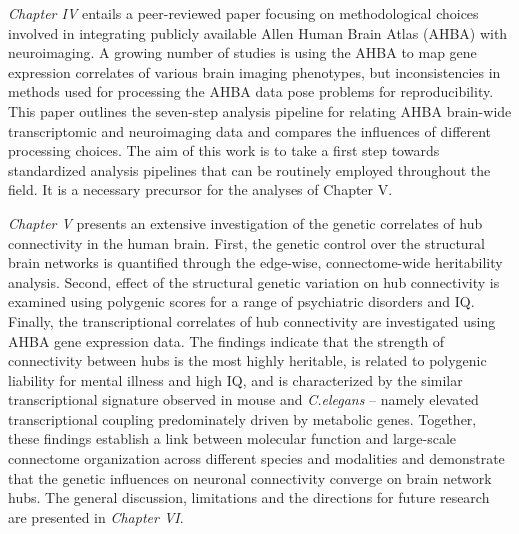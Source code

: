 \textit{Chapter IV} entails a peer-reviewed paper focusing on methodological choices involved in integrating publicly available Allen Human Brain Atlas (AHBA) with neuroimaging. A growing number of studies is using the AHBA to map gene expression correlates of various brain imaging phenotypes, but inconsistencies in methods used for processing the AHBA data pose problems for reproducibility. This paper outlines the seven-step analysis pipeline for relating AHBA brain-wide transcriptomic and neuroimaging data and compares the influences of different processing choices. The aim of this work is to take a first step towards standardized analysis pipelines that can be routinely employed throughout the field. It is a necessary precursor for the analyses of Chapter V.

\textit{Chapter V} presents an extensive investigation of the genetic correlates of hub connectivity in the human brain. First, the genetic control over the structural brain networks is quantified through the edge-wise, connectome-wide heritability analysis. Second, effect of the structural genetic variation on hub connectivity is examined using polygenic scores for a range of psychiatric disorders and IQ. Finally, the transcriptional correlates of hub connectivity are investigated using AHBA gene expression data. The findings indicate that the strength of connectivity between hubs is the most highly heritable, is related to polygenic liability for mental illness and high IQ, and is characterized by the similar transcriptional signature observed in mouse and \textit{C.elegans} -- namely elevated transcriptional coupling predominately driven by metabolic genes. Together, these findings establish a link between molecular function and large-scale connectome organization across different species and modalities and demonstrate that the genetic influences on neuronal connectivity converge on brain network hubs. The general discussion, limitations and the directions for future research are presented in \textit{Chapter VI}.
